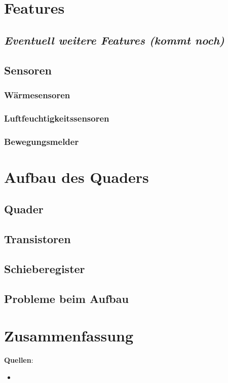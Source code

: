 \documentclass[12pt,a4paper]{article}
\begin{document}
\subsection{}


\section{Features}

\subsection{\textit{Eventuell weitere Features (kommt noch)}}

\subsection{Sensoren}

\subsubsection{Wärmesensoren}

\subsubsection{Luftfeuchtigkeitssensoren}

\subsubsection{Bewegungsmelder}

\section{Aufbau des Quaders}

\subsection{Quader}

\subsection{Transistoren}

\subsection{Schieberegister}

\subsection{Probleme beim Aufbau}

\section{Zusammenfassung}

\newpage

\textbf{Quellen}:

\begin{itemize}
    \item 
\end{itemize}
\end{document}
